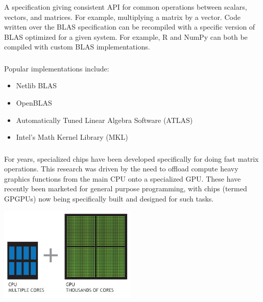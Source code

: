 \documentclass[xetex,mathserif,serif,aspectratio=169]{beamer}
\begin{document}
\begin{frame}[fragile] \frametitle{} \oldB \small

\textbf{}

A specification giving consistent API for common operations between
scalars, vectors, and matrices. For example, multiplying a matrix
by a vector. Code written over the BLAS specification can be recompiled
with a specific version of BLAS optimized for a given system. For example,
R and NumPy can both be compiled with custom BLAS implementations.

\end{frame}

\begin{frame}[fragile] \frametitle{} \oldB \small

\textbf{}

Popular implementations include:
\begin{itemize}
\item Netlib BLAS
\item OpenBLAS
\item Automatically Tuned Linear Algebra Software (ATLAS)
\item Intel's Math Kernel Library (MKL)
\end{itemize}

\end{frame}

\begin{frame}[fragile] \frametitle{} \oldB \small

\textbf{}

For years, specialized chips have been developed specifically for
doing fast matrix operations. This research was driven by the need
to offload compute heavy graphics functions from the main CPU onto
a specialized GPU. These have recently been marketed for general
purpose programming, with chips (termed GPGPUs) now being specifically
built and designed for such tasks.

\begin{center}
\includegraphics[height=4.5cm]{img/gpgpu.jpg}
\end{center}

\end{frame}
\end{document}
